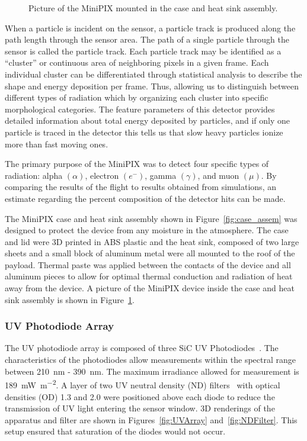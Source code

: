 \begin{figure}[!h]
\begin{minipage}[c]{0.49\linewidth}
    \caption{Picture of the MiniPIX mounted in the case and heat sink assembly.} %
    \label{fig:case_assem_pic}
  \end{minipage}
\end{figure}

When a particle is incident on the sensor, a particle track is produced along the path length through the sensor area. The path of a single particle through the sensor is called the particle track.  Each particle track may be identified as a ``cluster'' or continuous area of neighboring pixels in a given frame. Each individual cluster can be differentiated through statistical analysis to describe the shape and energy deposition per frame. Thus, allowing us to distinguish between different types of radiation which by organizing each cluster into specific morphological categories. The feature parameters of this detector provides detailed information about total energy deposited by particles, and if only one particle is traced in the detector this tells us that slow heavy particles ionize more than fast moving ones. 

The primary purpose of the MiniPIX was to detect four specific types of radiation: alpha $(\alpha)$, electron $({e^-})$, gamma $({\gamma})$, and muon $({\mu})$. By comparing the results of the flight to results obtained from simulations, an estimate regarding the percent composition of the detector hits can be made.

The MiniPIX case and heat sink assembly shown in Figure~\ref{fig:case_assem} was designed to protect the device from any moisture in the atmosphere. The case and lid were 3D printed in ABS plastic and the heat sink, composed of two large sheets and a small block of aluminum metal were all mounted to the roof of the payload. Thermal paste was applied between the contacts of the device and all aluminum pieces to allow for optimal thermal conduction and radiation of heat away from the device. A picture of the MiniPIX device inside the case and heat sink assembly is shown in Figure~\ref{fig:case_assem_pic}.

\subsubsection{UV Photodiode Array}
The UV photodiode array is composed of three SiC UV Photodiodes~\cite{JIC 139}. The characteristics of the photodiodes allow measurements within the spectral range between \SI{210}{\nano\meter} - \SI{390}{\nano\meter}. The maximum irradiance allowed for measurement is \SI{189}{\milli\watt\per\meter\squared}. A layer of two UV neutral density (ND) filters~\cite{Thor Labs} with optical densities (OD) 1.3 and 2.0 were positioned above each diode to reduce the transmission of UV light entering the sensor window. 3D renderings of the apparatus and filter are shown in Figures~\ref{fig:UVArray} and~\ref{fig:NDFilter}. This setup ensured that saturation of the diodes would not occur.


